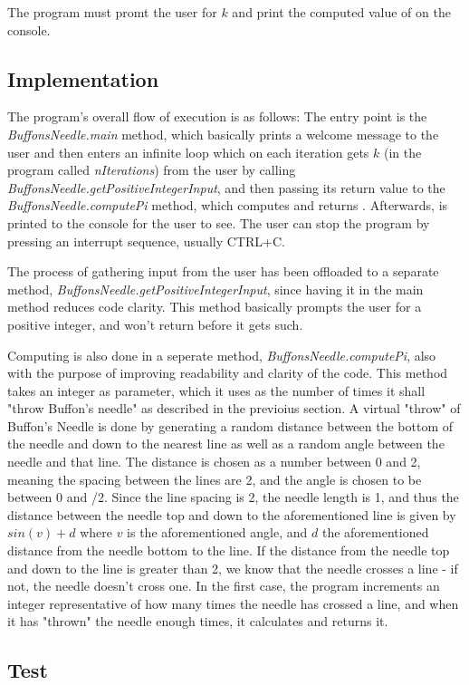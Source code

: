 \documentclass{scrartcl}
\begin{document}
The program must promt the user for $k$ and print the computed
value of \pi on the console.

\subsection*{Implementation}
The program's overall flow of execution is as follows:
The entry point is the \emph{BuffonsNeedle.main} method, which
basically prints a welcome message to the user and then enters an
infinite loop which on each iteration gets $k$ (in the program
called \emph{nIterations}) from the user by calling
\emph{BuffonsNeedle.getPositiveIntegerInput}, and then passing
its return value to the \emph{BuffonsNeedle.computePi} method, which
computes and returns \pi. Afterwards, \pi is printed to the
console for the user to see. The user can stop the program by pressing
an interrupt sequence, usually CTRL+C.

The process of gathering input from the user has been offloaded to a
separate method, \emph{BuffonsNeedle.getPositiveIntegerInput}, since
having it in the main method reduces code clarity. This method
basically prompts the user for a positive integer, and won't return
before it gets such.

Computing \pi is also done in a seperate method, \emph{BuffonsNeedle.computePi},
also with the purpose of improving readability and clarity of the code.
This method takes an integer as parameter, which it uses as the number of times it shall
"throw Buffon's needle" as described in the previoius section. A virtual
"throw" of Buffon's Needle is done by generating a random distance between the bottom
of the needle and down to the nearest line as well as a random angle between the
needle and that line. The distance is chosen as a number between 0 and 2, meaning the
spacing between the lines are 2, and the angle is chosen to be between 0 and \pi/2.
Since the line spacing is 2, the needle length is 1, and thus the distance between
the needle top and down to the aforementioned line is given by $sin(v)+d$ where $v$ is the
aforementioned angle, and $d$ the aforementioned distance from the needle bottom to the line.
If the distance from the needle top and down to the line is greater than 2,
we know that the needle crosses a line - if not, the needle doesn't cross one.
In the first case, the program increments an integer representative of how many
times the needle has crossed a line, and when it has "thrown" the needle
enough times, it calculates \pi and returns it.

\subsection*{Test}
\end{document}
